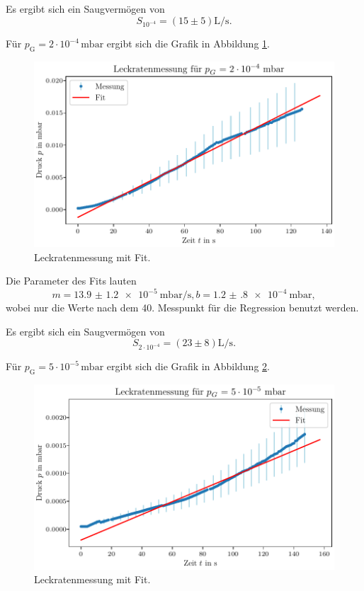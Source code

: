 Es ergibt sich ein Saugvermögen von
\begin{equation}
    S_{10^{-4}} = (\num{15} \pm \num{5}) \si{\liter\per\second}.
\end{equation}

Für $p_\text{G} = 2 \cdot 10^{-4} \, \si{\milli\bar}$ ergibt sich die Grafik in Abbildung \ref{fig:TP_Leck_2e4}.

\begin{figure}[H]
    \centering
    \includegraphics[width=\textwidth]{plots/TP_Leck_2e4.pdf}
    \caption{Leckratenmessung mit Fit.}
    \label{fig:TP_Leck_2e4}
\end{figure}

Die Parameter des Fits lauten 
\begin{equation}
    m = \qty{13.9(12)e-5}{\milli\bar\per\second}, b = \qty{1.2(8)e-4}{\milli\bar},
\end{equation}
wobei nur die Werte nach dem 40. Messpunkt
für die Regression benutzt werden.

Es ergibt sich ein Saugvermögen von
\begin{equation}
    S_{2 \cdot 10^{-4}} = (\num{23} \pm \num{8}) \si{\liter\per\second}.
\end{equation}

Für $p_\text{G} = 5 \cdot 10^{-5} \, \si{\milli\bar}$ ergibt sich die Grafik in Abbildung \ref{fig:TP_Leck_5e5}.

\begin{figure}[H]
    \centering
    \includegraphics[width=\textwidth]{plots/TP_Leck_5e5.pdf}
    \caption{Leckratenmessung mit Fit.}
    \label{fig:TP_Leck_5e5}
\end{figure}

